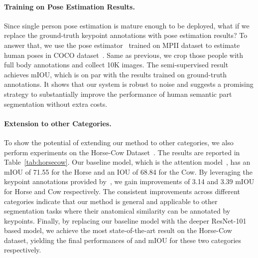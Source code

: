 \documentclass[10pt,twocolumn,letterpaper]{article}
\begin{document}
\paragraph{Training on Pose Estimation Results.}
Since single person pose estimation is mature enough to be deployed, what if we replace the ground-truth keypoint annotations with pose estimation results? To answer that, we use the pose estimator~\cite{fang2017rmpe} trained on MPII dataset to estimate human poses in COCO dataset~\cite{lin2014microsoft}. Same as previous, we crop those people with full body annotations and collect 10K images. The semi-supervised result achieves  mIOU, which is on par with the results trained on ground-truth annotations. It shows that our system is robust to noise and suggests a promising strategy to substantially improve the performance of human semantic part segmentation without extra costs.
\vspace{-4mm}
\paragraph{Extension to other Categories.}
To show the potential of extending our method to other categories, we also perform experiments on the Horse-Cow Dataset~\cite{wang2015semantic}. The results are reported in Table~\ref{tab:horsecow}. Our baseline model, which is the attention model~\cite{chen2016attention}, has an mIOU of 71.55 for the Horse and an IOU of 68.84 for the Cow. By leveraging the keypoint annotations provided by~\cite{PoseletsPAMI}, we gain improvements of 3.14 and 3.39 mIOU for Horse and Cow respectively. The consistent improvements across different categories indicate that our method is general and applicable to other segmentation tasks where their anatomical similarity can be annotated by keypoints. Finally, by replacing our baseline model with the deeper ResNet-101 based model, we achieve the most state-of-the-art result on the Horse-Cow dataset, yielding the final performances of  and  mIOU for these two categories respectively.
\end{document}
